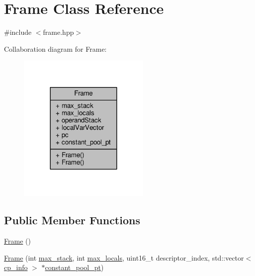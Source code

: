 \hypertarget{classFrame}{\section{Frame Class Reference}
\label{classFrame}
}


{\ttfamily \#include $<$frame.\+hpp$>$}



Collaboration diagram for Frame\+:\nopagebreak
\begin{figure}[H]
\begin{center}
\leavevmode
\includegraphics[width=180pt]{classFrame__coll__graph}
\end{center}
\end{figure}
\subsection*{Public Member Functions}
\begin{DoxyCompactItemize}
\item 
\hyperlink{classFrame_ad2e5946cf41d4817e750500acf05d02b}{Frame} ()
\item 
\hyperlink{classFrame_a90798580dd69c6e4b927db8aea2a419e}{Frame} (int \hyperlink{classFrame_a2096ad8a85ebe1c025f9e18a5cc632b9}{max\+\_\+stack}, int \hyperlink{classFrame_a1bcd26b0c048fa4ce6c00c28943d752f}{max\+\_\+locals}, uint16\+\_\+t descriptor\+\_\+index, std\+::vector$<$ \hyperlink{structs_8hpp_a0c0d87e91cda2669bf03488501eccd4d}{cp\+\_\+info} $>$ $\ast$\hyperlink{classFrame_ad26c914060a8faccf9c2231e6ad6a6e1}{constant\+\_\+pool\+\_\+pt})
\end{DoxyCompactItemize}
